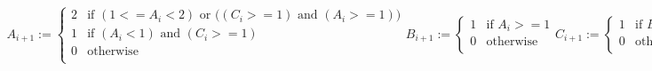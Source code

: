 \begin{center}




$
\begin{array}{l}

A_{i+1} :=\left\{ \begin{array}{cl}
      2 & \mbox{if $(1 <= A_i < 2)$ or $((C_i >= 1)$ and $(A_i >= 1))$} \\
      1 & \mbox{if $(A_i < 1)$ and $(C_i >= 1)$} \\
      0 & \mbox{otherwise}  \\
     \end{array}
\right.
B_{i+1} :=\left\{ \begin{array}{cl}
      1 & \mbox{if $A_i >= 1$} \\
      0 & \mbox{otherwise}  \\
     \end{array}
\right.
C_{i+1} :=\left\{ \begin{array}{cl}
      1 & \mbox{if $B_i >= 1$} \\
      0 & \mbox{otherwise}  \\
     \end{array}
\right.
\end{array}
$

\end{center}


